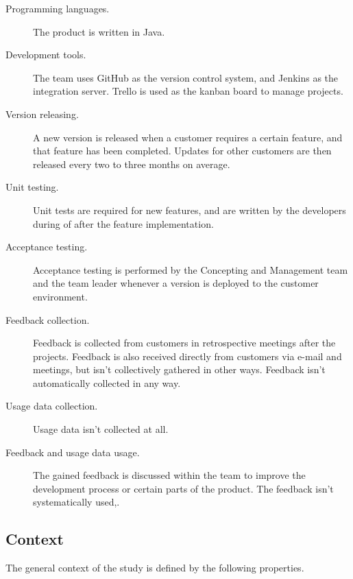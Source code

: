 \documentclass[english]{tktltiki2}
\theoremstyle{definition}
\theoremstyle{remark}
\begin{document}
\begin{description}
  \item[Programming languages.] The product is written in Java.
  \item[Development tools.] The team uses GitHub as the version control system, and Jenkins as the integration server. Trello is used as the kanban board to manage projects. 
  \item[Version releasing.] A new version is released when a customer requires a certain feature, and that feature has been completed. Updates for other customers are then released every two to three months on average.
  \item[Unit testing.] Unit tests are required for new features, and are written by the developers during of after the feature implementation.
  \item[Acceptance testing.] Acceptance testing is performed by the Concepting and Management team and the team leader whenever a version is deployed to the customer environment. 
  \item[Feedback collection.] Feedback is collected from customers in retrospective meetings after the projects. Feedback is also received directly from customers via e-mail and meetings, but isn't collectively gathered in other ways. Feedback isn't automatically collected in any way.
  \item[Usage data collection.] Usage data isn't collected at all.
  \item[Feedback and usage data usage.] The gained feedback is discussed within the team to improve the development process or certain parts of the product. The feedback isn't systematically used,. 
\end{description}

\subsection{Context} %

The general context of the study is defined by the following properties.
\end{document}
